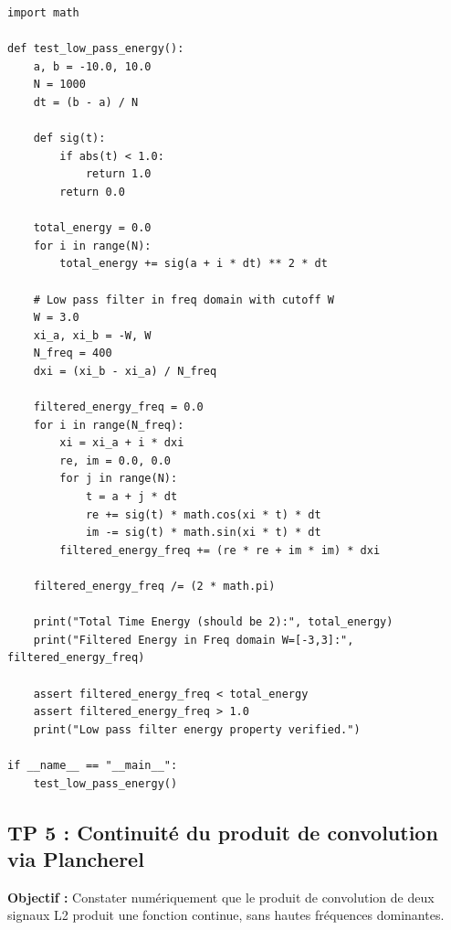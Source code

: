 \documentclass[11pt,a4paper]{article}
\begin{document}
\begin{lstlisting}
import math

def test_low_pass_energy():
    a, b = -10.0, 10.0
    N = 1000
    dt = (b - a) / N

    def sig(t):
        if abs(t) < 1.0:
            return 1.0
        return 0.0

    total_energy = 0.0
    for i in range(N):
        total_energy += sig(a + i * dt) ** 2 * dt

    # Low pass filter in freq domain with cutoff W
    W = 3.0
    xi_a, xi_b = -W, W
    N_freq = 400
    dxi = (xi_b - xi_a) / N_freq

    filtered_energy_freq = 0.0
    for i in range(N_freq):
        xi = xi_a + i * dxi
        re, im = 0.0, 0.0
        for j in range(N):
            t = a + j * dt
            re += sig(t) * math.cos(xi * t) * dt
            im -= sig(t) * math.sin(xi * t) * dt
        filtered_energy_freq += (re * re + im * im) * dxi

    filtered_energy_freq /= (2 * math.pi)

    print("Total Time Energy (should be 2):", total_energy)
    print("Filtered Energy in Freq domain W=[-3,3]:", filtered_energy_freq)

    assert filtered_energy_freq < total_energy
    assert filtered_energy_freq > 1.0
    print("Low pass filter energy property verified.")

if __name__ == "__main__":
    test_low_pass_energy()
\end{lstlisting}



\subsection*{TP 5 : Continuité du produit de convolution via Plancherel}

\textbf{Objectif :} Constater numériquement que le produit de convolution de deux signaux L2 produit une fonction continue, sans hautes fréquences dominantes.
\end{document}
